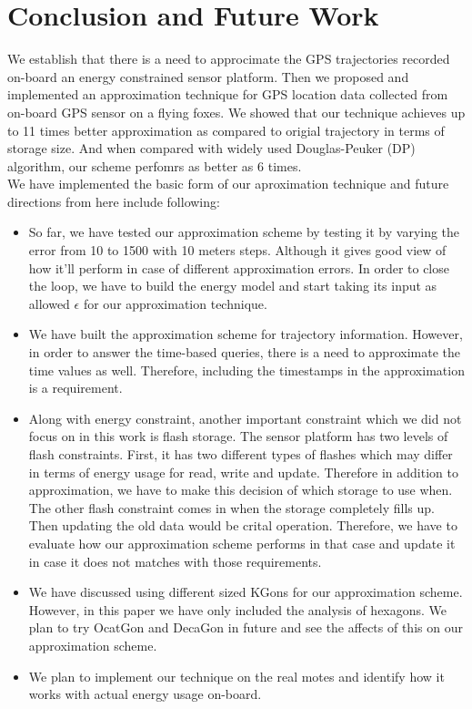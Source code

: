 \documentclass[conference]{IEEEtran}
\begin{document}
\section{Conclusion and Future Work}
We establish that there is a need to approcimate the GPS trajectories recorded on-board an energy constrained sensor platform. Then we proposed and implemented an approximation technique for GPS location data collected from on-board GPS sensor on a flying foxes. We showed that our technique achieves up to 11 times better approximation as compared to origial trajectory in terms of storage size. And when compared with widely used Douglas-Peuker (DP) algorithm, our scheme perfomrs as better as 6 times.\\
We have implemented the basic form of our aproximation technique and future directions from here include following:
\begin{itemize}
\item So far, we have tested our approximation scheme by testing it by varying the error from 10 to 1500 with 10 meters steps. Although it gives good view of how it'll perform in case of different approximation errors. In order to close the loop, we have to build the energy model and start taking its input as allowed $\epsilon$ for our approximation technique.
\item We have built the approximation scheme for trajectory information. However, in order to answer the time-based queries, there is a need to approximate the time values as well. Therefore, including the timestamps in the approximation is a requirement. 
\item Along with energy constraint, another important constraint which we did not focus on in this work is flash storage. The sensor platform has two levels of flash constraints. First, it has two different types of flashes which may differ in terms of energy usage for read, write and update. Therefore in addition to approximation, we have to make this decision of which storage to use when. The other flash constraint comes in when the storage completely fills up. Then updating the old data would be crital operation. Therefore, we have to evaluate how our approximation scheme performs in that case and update it in case it does not matches with those requirements.
\item We have discussed using different sized KGons for our approximation scheme. However, in this paper we have only included the analysis of hexagons. We plan to try OcatGon and DecaGon in future and see the affects of this on our approximation scheme.
\item We plan to implement our technique on the real motes and identify how it works with actual energy usage on-board.
\end{itemize}
\end{document}
